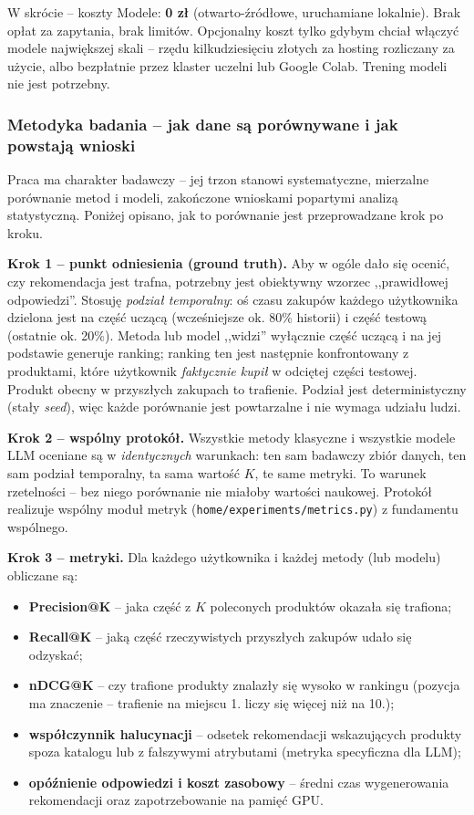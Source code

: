 \documentclass[12pt,a4paper]{article}
\newcommand{\topicsection}[1]{\subsubsection*{#1}}
\begin{document}
\begin{infobox}{W skrócie -- koszty}
Modele: \textbf{0 zł} (otwarto-źródłowe, uruchamiane lokalnie). Brak opłat za zapytania, brak limitów. Opcjonalny koszt tylko gdybym chciał włączyć modele największej skali -- rzędu kilkudziesięciu złotych za hosting rozliczany za użycie, albo bezpłatnie przez klaster uczelni lub Google Colab. Trening modeli nie jest potrzebny.
\end{infobox}

\topicsection{Metodyka badania -- jak dane są porównywane i jak powstają wnioski}
Praca ma charakter badawczy -- jej trzon stanowi systematyczne, mierzalne porównanie metod i modeli, zakończone wnioskami popartymi analizą statystyczną. Poniżej opisano, jak to porównanie jest przeprowadzane krok po kroku.

\textbf{Krok 1 -- punkt odniesienia (ground truth).} Aby w ogóle dało się ocenić, czy rekomendacja jest trafna, potrzebny jest obiektywny wzorzec ,,prawidłowej odpowiedzi''. Stosuję \emph{podział temporalny}: oś czasu zakupów każdego użytkownika dzielona jest na część uczącą (wcześniejsze ok. 80\% historii) i część testową (ostatnie ok. 20\%). Metoda lub model ,,widzi'' wyłącznie część uczącą i na jej podstawie generuje ranking; ranking ten jest następnie konfrontowany z produktami, które użytkownik \emph{faktycznie kupił} w odciętej części testowej. Produkt obecny w przyszłych zakupach to trafienie. Podział jest deterministyczny (stały \emph{seed}), więc każde porównanie jest powtarzalne i nie wymaga udziału ludzi.

\textbf{Krok 2 -- wspólny protokół.} Wszystkie metody klasyczne i wszystkie modele LLM oceniane są w \emph{identycznych} warunkach: ten sam badawczy zbiór danych, ten sam podział temporalny, ta sama wartość $K$, te same metryki. To warunek rzetelności -- bez niego porównanie nie miałoby wartości naukowej. Protokół realizuje wspólny moduł metryk (\texttt{home/experiments/metrics.py}) z fundamentu wspólnego.

\textbf{Krok 3 -- metryki.} Dla każdego użytkownika i każdej metody (lub modelu) obliczane są:
\begin{itemize}
\item \textbf{Precision@K} -- jaka część z $K$ poleconych produktów okazała się trafiona;
\item \textbf{Recall@K} -- jaką część rzeczywistych przyszłych zakupów udało się odzyskać;
\item \textbf{nDCG@K} -- czy trafione produkty znalazły się wysoko w rankingu (pozycja ma znaczenie -- trafienie na miejscu 1. liczy się więcej niż na 10.);
\item \textbf{współczynnik halucynacji} -- odsetek rekomendacji wskazujących produkty spoza katalogu lub z fałszywymi atrybutami (metryka specyficzna dla LLM);
\item \textbf{opóźnienie odpowiedzi i koszt zasobowy} -- średni czas wygenerowania rekomendacji oraz zapotrzebowanie na pamięć GPU.
\end{itemize}
\end{document}
